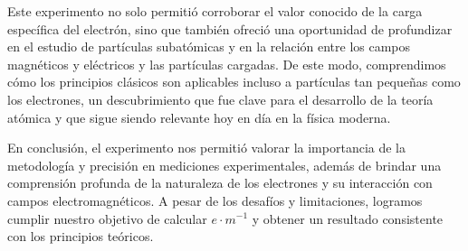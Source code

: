 \documentclass[a4paper]{article}
\begin{document}
    Este experimento no solo permitió corroborar el valor conocido de la carga específica del electrón, sino que también ofreció una oportunidad de profundizar en el estudio de partículas subatómicas y en la relación entre los campos magnéticos y eléctricos y las partículas cargadas. De este modo, comprendimos cómo los principios clásicos son aplicables incluso a partículas tan pequeñas como los electrones, un descubrimiento que fue clave para el desarrollo de la teoría atómica y que sigue siendo relevante hoy en día en la física moderna.

    En conclusión, el experimento nos permitió valorar la importancia de la metodología y precisión en mediciones experimentales, además de brindar una comprensión profunda de la naturaleza de los electrones y su interacción con campos electromagnéticos. A pesar de los desafíos y limitaciones, logramos cumplir nuestro objetivo de calcular $e \cdot m^{-1}$ y obtener un resultado consistente con los principios teóricos.
\end{document}
